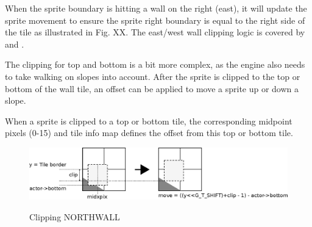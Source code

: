 \documentclass[book.tex]{subfiles}
\begin{document}
\par
When the sprite boundary is hitting a wall on the right (east), it will update the sprite movement to ensure the sprite right boundary is equal to the right side of the tile as illustrated in Fig. XX. The east/west wall clipping logic is covered by  and . 
\\
\begin{minipage}{\textwidth}
  
\end{minipage}
\label{wallclip_array}
\par
The clipping for top and bottom is a bit more complex, as the engine also needs to take walking on slopes into account. After the sprite is clipped to the top or bottom of the wall tile, an offset can be applied to move a sprite up or down a slope. 
\\
\begin{minipage}{\textwidth}
  
\end{minipage}
\label{wallclip_array}
\par
When a sprite is clipped to a top or bottom tile, the corresponding midpoint pixels (0-15) and tile info map defines the offset from this top or bottom tile.
\begin{figure}[H]
  \centering
  \includegraphics[width=\textwidth]{imgs/drawings/clipping.eps}
  \label{fig:clipping_north}
  \caption{Clipping NORTHWALL}
\end{figure}

\par
\begin{minipage}{\textwidth}
  
\end{minipage}
\label{wallclip_array}
\par
\end{document}

